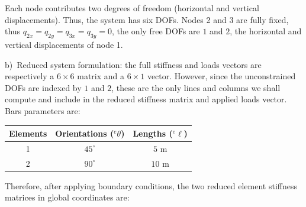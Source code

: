 \documentclass[12pt]{article}
\begin{document}
\hspace{1cm}
\begin{minipage}[t]{0.48\textwidth}
    \vspace{-1.5cm}
    Each node contributes two degrees of freedom (horizontal and vertical displacements). Thus, the system has six DOFs. Nodes 2 and 3 are fully fixed, thus $q_{2x}=q_{2y}=q_{3x}=q_{3y}=0$, the only free DOFs are $1$ and $2$, the horizontal and vertical displacements of node 1.
\end{minipage}

\vspace{0.3cm}
\noindent b)\ Reduced system formulation: the full stiffness and loads vectors are respectively a $6\times 6$ matrix and a $6\times 1$ vector. However, since the unconstrained DOFs are indexed by $1$ and $2$, these are the only lines and columns we shall compute and include in the reduced stiffness matrix and applied loads vector. Bars parameters are:
\begin{center}
    \begin{tabular}{c|c|c}
        Elements & Orientations (${}^e\theta$) & Lengths (${}^e\ell$) \\
        \hline
        1        & $45^{\circ}$                & $5$ m                \\
        2        & $90^{\circ} $               & $10$ m               \\
    \end{tabular}
\end{center}
Therefore, after applying boundary conditions, the two reduced element stiffness matrices in global coordinates are:
\end{document}

